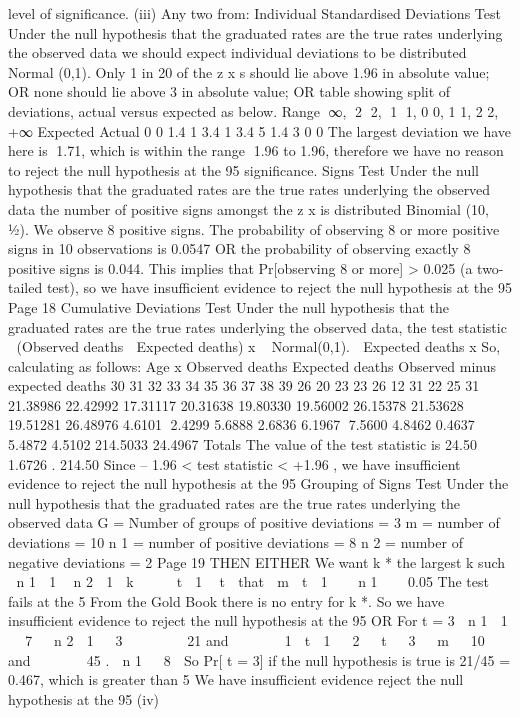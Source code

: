 level of significance.
(iii)
Any two from:
Individual Standardised Deviations Test
Under the null hypothesis that the graduated rates are the true rates underlying the
observed data
we should expect individual deviations to be distributed Normal (0,1).
Only 1 in 20 of the z x s should lie above 1.96 in absolute value;
OR
none should lie above 3 in absolute value;
OR
table showing split of deviations, actual versus expected as below.
Range ∞, 2 2, 1 1, 0 0, 1 1, 2 2, +∞
Expected
Actual 0
0 1.4
1 3.4
1 3.4
5 1.4
3 0
0
The largest deviation we have here is 1.71,
which is within the range 1.96 to 1.96,
therefore we have no reason to reject the null hypothesis at the 95%
significance.
Signs Test
Under the null hypothesis that the graduated rates are the true rates underlying the
observed data
the number of positive signs amongst the z x is distributed
Binomial (10, 1⁄2).
We observe 8 positive signs.
The probability of observing 8 or more positive signs in 10 observations is 0.0547
OR the probability of observing exactly 8 positive signs is 0.044.
This implies that Pr[observing 8 or more] > 0.025 (a two-tailed test),
so we have insufficient evidence to reject the null hypothesis at the 95%
Page 18%
Cumulative Deviations Test
Under the null hypothesis that the graduated rates are the true rates underlying the
observed data, the test statistic
 (Observed deaths  Expected deaths)
x
~ Normal(0,1).
 Expected deaths
x
So, calculating as follows:
Age x Observed deaths Expected deaths Observed minus
expected deaths
30
31
32
33
34
35
36
37
38
39 26
20
23
23
26
12
31
22
25
31 21.38986
22.42992
17.31117
20.31638
19.80330
19.56002
26.15378
21.53628
19.51281
26.48976 4.6101
2.4299
5.6888
2.6836
6.1967
7.5600
4.8462
0.4637
5.4872
4.5102
214.5033 24.4967
Totals
The value of the test statistic is
24.50
 1.6726 .
214.50
Since – 1.96 < test statistic < +1.96 ,
we have insufficient evidence to reject the null hypothesis at the 95%
Grouping of Signs Test
Under the null hypothesis that the graduated rates are the true rates underlying the
observed data
G = Number of groups of positive deviations = 3
m = number of deviations = 10
n 1 = number of positive deviations = 8
n 2 = number of negative deviations = 2
Page 19%
THEN EITHER
We want k * the largest k such
 n 1  1  n 2  1 
k 


 t  1  t 
that
 m 
t  1
 
 n 1 

 0.05
The test fails at the 5%
From the Gold Book there is no entry for k *.
So we have insufficient evidence to reject the null hypothesis at the 95%
OR
For t = 3
 n 1  1   7 
 n 2  1   3 

     21 and 
     1
 t  1   2 
 t   3 
 m   10 
and       45 .
 n 1   8 
So Pr[ t = 3] if the null hypothesis is true is 21/45 = 0.467, which is greater than 5%
We have insufficient evidence reject the null hypothesis at the 95%
(iv)

